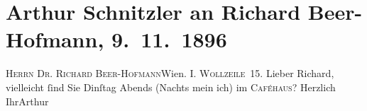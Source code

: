 

         
         \renewcommand{\erwaehntePersonen}{Personen: Richard Beer-Hofmann}
         \renewcommand{\erwaehnteOrte}{Orte: Berlin, I., Innere Stadt, Wien, Wollzeile}
         \renewcommand{\erwaehnteWerke}{}
               \section[Arthur Schnitzler an Richard Beer-Hofmann, 9. 11. 1896]{ Arthur Schnitzler an Richard Beer-Hofmann, 9. 11. 1896}\nopagebreak{}\rehead{ }\begin{ledgroupsized}[t]{13cm}\normalsize\beginnumbering \toendnotes[C]{\smallbreak\pagebreak[2]} 
\pstart{}{\pb}\textsc{Herrn Dr. Richard Beer-Hofmann}\pend{}\pstart{}Wien. \pend{}\pstart{}\textsc{I. Wollzeile 15}.\pend{}{\bigskip}\pstart
           \noindent{}{\pb}Lieber Richard, vielleicht ſind Sie Dinſtag{ }Abends{ }\introOben{}(Nachts mein ich)\introOben{} im \textsc{Caféhaus}?\pend
           \pstart Herzlich Ihr\spacefill\mbox{Arthur}\pend{}
         
         \endnumbering{}\end{ledgroupsized}  \newcommand{\dateiname}{L00618}\newcommand{\titel}{Arthur Schnitzler an Richard Beer-Hofmann, 9. 11. 1896}\newcommand{\editorInnen}{Martin Anton Müller und Gerd-Hermann Susen}
      